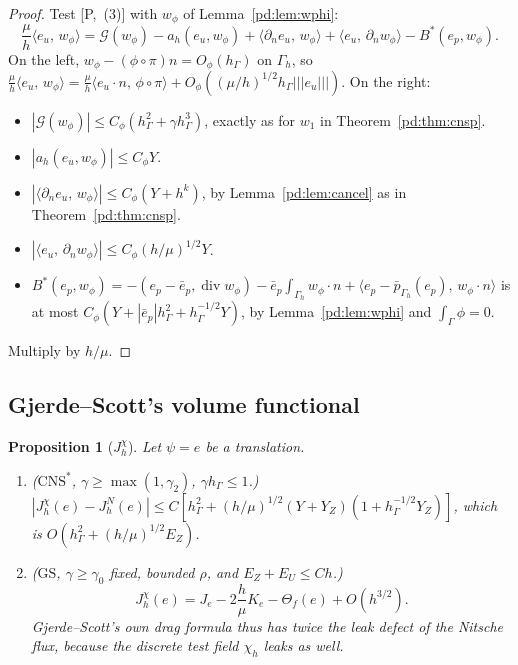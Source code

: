 \documentclass[11pt,reqno]{amsart}
\theoremstyle{plain}
\newtheorem{proposition}[theorem]{Proposition}
\theoremstyle{definition}
\newcommand{\hG}{h_\Gamma}
\newcommand{\Gh}{\Gamma_h}
\newcommand{\dn}{\partial_n}
\newcommand{\pbar}{\bar p}
\newcommand{\ip}[2]{\langle #1,\, #2\rangle}
\newcommand{\tnorm}[1]{|\!|\!|#1|\!|\!|}
\newcommand{\GS}{\mathrm{GS}}
\newcommand{\CNS}{\mathrm{CNS}^\ast}
\renewcommand{\div}{\operatorname{div}}
\newcommand{\Gc}{\mathcal G}
\newcommand{\Pref}[1]{\textup{[P,~#1]}}
\begin{document}
\begin{proof}
Test \Pref{(3)} with $w_\phi$ of Lemma~\ref{pd:lem:wphi}:
\[
\frac\mu h\ip{e_u}{w_\phi}=\Gc(w_\phi)-a_h(e_u,w_\phi)+\ip{\dn e_u}{w_\phi}+\ip{e_u}{\dn w_\phi}-B^\ast(e_p,w_\phi).
\]
On the left, $w_\phi-(\phi\circ\pi)n=O_\phi(\hG)$ on $\Gh$, so $\frac\mu h\ip{e_u}{w_\phi}=\frac\mu h\ip{e_u\cdot n}{\phi\circ\pi}+O_\phi((\mu/h)^{1/2}\hG\tnorm{e_u})$. On the right:
\begin{itemize}
\item $|\Gc(w_\phi)|\le C_\phi(\hG^2+\gamma\hG^3)$, exactly as for $w_1$ in Theorem~\ref{pd:thm:cnsp}.
\item $|a_h(e_u,w_\phi)|\le C_\phi Y$.
\item $|\ip{\dn e_u}{w_\phi}|\le C_\phi(Y+h^k)$, by Lemma~\ref{pd:lem:cancel} as in Theorem~\ref{pd:thm:cnsp}.
\item $|\ip{e_u}{\dn w_\phi}|\le C_\phi(h/\mu)^{1/2}Y$.
\item $B^\ast(e_p,w_\phi)=-(e_p-\bar e_p,\div w_\phi)-\bar e_p\int_{\Gh}w_\phi\cdot n+\ip{e_p-\pbar_{\Gh}(e_p)}{w_\phi\cdot n}$ is at most $C_\phi(Y+|\bar e_p|\hG^2+\hG^{-1/2}Y)$, by Lemma~\ref{pd:lem:wphi} and $\int_\Gamma\phi=0$.
\end{itemize}
Multiply by $h/\mu$.
\end{proof}

\subsection{Gjerde--Scott's volume functional}

\begin{proposition}[$J^\chi_h$]\label{pd:prop:chi}
Let $\psi=e$ be a translation.
\begin{enumerate}[label=(\alph*)]
\item ($\CNS$, $\gamma\ge\max(1,\gamma_2)$, $\gamma\hG\le1$.) $|J^\chi_h(e)-J^N_h(e)|\le C[\hG^2+(h/\mu)^{1/2}(Y+Y_Z)(1+\hG^{-1/2}Y_Z)]$, which is $O(\hG^2+(h/\mu)^{1/2}E_Z)$.
\item ($\GS$, $\gamma\ge\gamma_0$ fixed, bounded $\rho$, and $E_Z+E_U\le Ch$.)
\[
J^\chi_h(e)=J_e-2\frac h\mu K_e-\Theta_f(e)+O(h^{3/2}).
\]
Gjerde--Scott's own drag formula thus has \emph{twice} the leak defect of the Nitsche flux, because the discrete test field $\chi_h$ leaks as well.
\end{enumerate}
\end{proposition}
\end{document}
